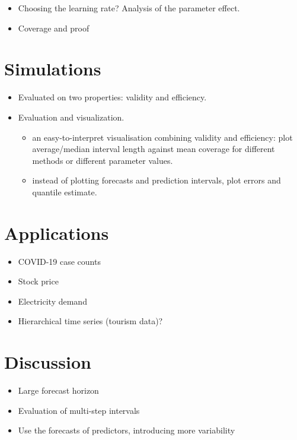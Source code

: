 \documentclass[
  11pt,
  a4paper,
]{article}
\theoremstyle{plain}
\theoremstyle{plain}
\theoremstyle{remark}
\begin{document}
\begin{itemize}
\item
  Choosing the learning rate? Analysis of the parameter effect.
\item
  Coverage and proof
\end{itemize}

\section{Simulations}\label{simulations}

\begin{itemize}
\item
  Evaluated on two properties: validity and efficiency.
\item
  Evaluation and visualization.

  \begin{itemize}
  \item
    an easy-to-interpret visualisation combining validity and
    efficiency: plot average/median interval length against mean
    coverage for different methods or different parameter values.
  \item
    instead of plotting forecasts and prediction intervals, plot errors
    and quantile estimate.
  \end{itemize}
\end{itemize}

\section{Applications}\label{applications}

\begin{itemize}
\item
  COVID-19 case counts
\item
  Stock price
\item
  Electricity demand
\item
  Hierarchical time series (tourism data)?
\end{itemize}

\section{Discussion}\label{discussion}

\begin{itemize}
\item
  Large forecast horizon
\item
  Evaluation of multi-step intervals
\item
  Use the forecasts of predictors, introducing more variability
\end{itemize}
\end{document}
